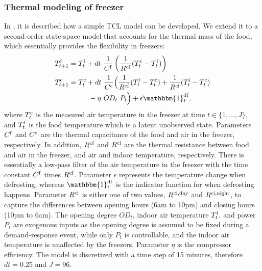 \documentclass[11pt,a4paper]{article}
\begin{document}
\subsubsection{Thermal modeling of freezer}

In \cite{hao2014aggregate}, it is described how a simple TCL model can be developed. We extend it to a second-order state-space model that accounts for the thermal mass of the food, which essentially provides the flexibility in freezers:
%
\begin{subequations}\label{eq:2ndFreezerStateSpace}
    \begin{align}
        T^{\rm{f}}_{t+1} & = T^{\rm{f}}_{t} + dt\  \frac{1}{C^{\rm{f}}}\left(\frac{1}{R^{\rm{cf}}} (T^{\rm{c}}_{t} - T^{\rm{f}}_{t}) \right)                                                                                         \\
        T^{\rm{c}}_{t+1} & = T^{\rm{c}}_t + dt\  \frac{1}{C^{\rm{c}}}\Bigl(\frac{1}{R^{\rm{cf}}} (T^{\rm{f}}_t - T^{\rm{c}}_t) + \frac{1}{R^{\rm{ci}}} (T^{\rm{i}}_t - T^{\rm{c}}_t)                                          \notag \\ & \mspace{50mu} - \eta\  OD_t \ P_t \Bigr) + \epsilon \mathbbm{1}^{\rm{df}}_{t},
    \end{align}
\end{subequations}
%
where $T^{\rm{c}}_t$ is the measured air temperature in the freezer at time $t \in \{1, \ldots, J\}$, and $T^{\rm{f}}_t$ is the food temperature which is a latent unobserved state.
Parameters $C^{\rm{f}}$ and $C^{\rm{c}}$ are the thermal capacitance of the food and air in the freezer, respectively. In addition, $R^{\rm{cf}}$ and $R^{\rm{ci}}$ are the thermal resistance between food and air in the freezer, and air and indoor temperature, respectively.
There is essentially a low-pass filter of the air temperature in the freezer with the time constant $C^{\rm{f}}$ times $R^{\rm{cf}}$. Parameter $\epsilon$ represents the temperature change when defrosting, whereas $\mathbbm{1}^{\rm{df}}_{t}$ is the indicator function for when defrosting happens. Parameter $R^{\rm{ci}}$ is either one of two values, $R^{\rm{ci}, \text{day}}$ and $R^{\rm{ci}, \text{night}}$, to capture the differences between opening hours (6am to 10pm) and closing hours (10pm to 6am). The opening degree $OD_t$, indoor air temperature $T^{\rm{i}}_t$, and power $P_t$ are exogenous inputs as the opening degree is assumed to be fixed during a demand-response event, while only $P_t$ is controllable, and the indoor air temperature is unaffected by the freezers. Parameter $\eta$ is the compressor efficiency. The model is discretized with a time step of 15 minutes, therefore $dt = 0.25$ and $J = 96$.
\end{document}
